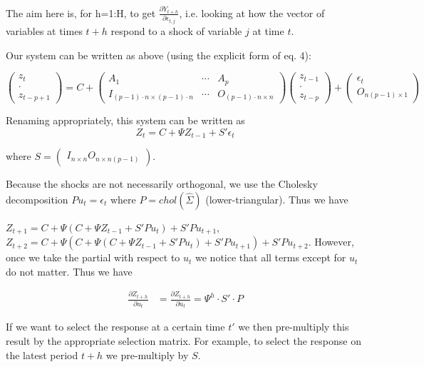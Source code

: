 \documentclass[11pt]{article}
\begin{document}
The aim here is, for h=1:H, to get $\frac{\partial Y_{t+h}}{\partial \epsilon_{t,j}}$, i.e. looking at how the vector of variables at times $t+h$ respond to a shock of variable $j$ at time $t$.

Our system can be written as above (using the explicit form of eq. 4):

$$\begin{pmatrix}
   z_{t}\\
   \cdot\\
   z_{t-p+1}
  \end{pmatrix} = C + 
  \begin{pmatrix} A_{1} & \cdots & A_{p}\\
  I_{(p-1)\cdot n \times (p-1)\cdot n} & \cdots & O_{(p-1)\cdot n\times n} \end{pmatrix} \begin{pmatrix}
   z_{t-1}\\
   \cdot\\
   z_{t-p}
  \end{pmatrix} + \begin{pmatrix}
   \epsilon_{t}\\
   O_{n(p-1) \times 1}
  \end{pmatrix}$$

Renaming appropriately, this system can be written as 
$$ Z_{t} = C + \Psi Z_{t-1} + S' \epsilon_{t}$$

where $S = \begin{pmatrix} I_{n\times n} O_{n\times n(p-1)} \end{pmatrix}$.

Because the shocks are not necessarily orthogonal, we use the Cholesky decomposition $Pu_{t} = \epsilon_{t}$ where $P = chol(\hat{\Sigma})$ (lower-triangular). Thus we have

$Z_{t+1} = C+ \Psi(C+ \Psi Z_{t-1} + S' P u_{t}) + S'Pu_{t+1}$, $Z_{t+2} = C + \Psi(C+ \Psi(C+ \Psi Z_{t-1} + S' P u_{t}) + S'Pu_{t+1}) + S'Pu_{t+2}$. However, once we take the partial with respect to $u_{t}$ we notice that all terms except for $u_{t}$ do not matter. Thus we have

\begin{align*}
\frac{\partial Z_{t+h}}{\partial u_{t}} &= \frac{\partial Z_{t+h}}{\partial u_{t}} = \Psi^{h}\cdot S' \cdot P 
\end{align*}

If we want to select the response at a certain time $t'$ we then pre-multiply this result by the appropriate selection matrix. For example, to select the response on the latest period $t+h$ we pre-multiply by $S$.
\clearpage
\end{document}
